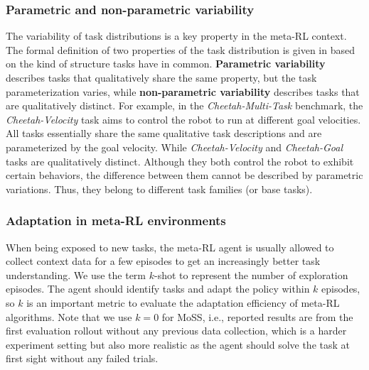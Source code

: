 \documentclass[letterpaper]{article} %
\begin{document}
\subsubsection{Parametric and non-parametric variability}The variability of task distributions is a key property in the meta-RL context. The formal definition of two properties of the task distribution is given in \cite{MetaWorld} based on the kind of structure tasks have in common. \textbf{Parametric variability} describes tasks that qualitatively share the same property, but the task parameterization varies, while \textbf{non-parametric variability} describes tasks that are qualitatively distinct. For example, in the \textit{Cheetah-Multi-Task} benchmark, the \textit{Cheetah-Velocity} task aims to control the robot to run at different goal velocities. All tasks essentially share the same qualitative task descriptions and are parameterized by the goal velocity. While \textit{Cheetah-Velocity} and \textit{Cheetah-Goal} tasks are qualitatively distinct. Although they both control the robot to exhibit certain behaviors, the difference between them cannot be described by parametric variations. Thus, they belong to different task families (or base tasks).




\subsubsection{Adaptation in meta-RL environments}When being exposed to new tasks, the meta-RL agent is usually allowed to collect context data for a few episodes to get an increasingly better task understanding. We use the term $k$-shot to represent the number of exploration episodes. The agent should identify tasks and adapt the policy within $k$ episodes, so $k$ is an important metric to evaluate the adaptation efficiency of meta-RL algorithms. Note that we use $k=0$ for MoSS, i.e., reported results are from the first evaluation rollout without any previous data collection, which is a harder experiment setting but also more realistic as the agent should solve the task at first sight without any failed trials. 
\end{document}
